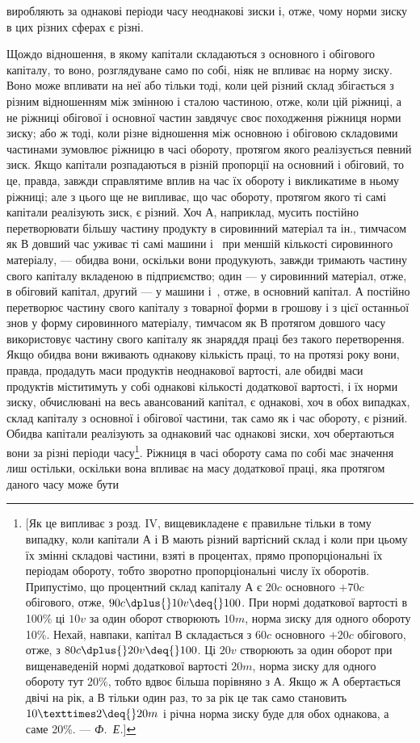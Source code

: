 \parcont{}  %
виробляють за однакові періоди часу неоднакові зиски і, отже,
чому норми зиску в цих різних сферах є різні.

Щождо відношення, в якому капітали складаються з основного і обігового капіталу, то воно,
розглядуване само по собі, ніяк не впливає на норму зиску. Воно може впливати на неї або тільки
тоді, коли цей різний склад збігається з різним відношенням між змінною і сталою частиною, отже,
коли цій ріжниці, а не ріжниці обігової і основної частин завдячує своє походження ріжниця норми
зиску; або ж тоді, коли різне відношення між основною і обіговою складовими частинами зумовлює
ріжницю в часі обороту, протягом якого реалізується певний зиск. Якщо капітали розпадаються в різній
пропорції на основний і обіговий, то це, правда, завжди справлятиме вплив
на час їх обороту і викликатиме в ньому ріжниці; але з цього
ще не випливає, що час обороту, протягом якого ті самі капітали реалізують зиск, є різний. Хоч $А$,
наприклад, мусить постійно перетворювати більшу частину продукту в сировинний матеріал та ін.,
тимчасом як $В$ довший час уживає ті самі
машини і~ при меншій кількості сировинного матеріалу, — обидва вони, оскільки вони продукують,
завжди тримають
частину свого капіталу вкладеною в підприємство; один — у сировинний матеріал, отже, в обіговий
капітал, другий — у машини
і~, отже, в основний капітал. $А$ постійно перетворює частину свого капіталу з товарної форми в
грошову і з цієї останньої знов у форму сировинного матеріалу, тимчасом як $В$ протягом довшого часу
використовує частину свого капіталу як
знаряддя праці без такого перетворення. Якщо обидва вони
вживають однакову кількість праці, то на протязі року вони,
правда, продадуть маси продуктів неоднакової вартості, але
обидві маси продуктів міститимуть у собі однакові кількості
додаткової вартості, і їх норми зиску, обчислювані на весь авансований капітал, є однакові, хоч в
обох випадках, склад капіталу з
основної і обігової частини, так само як і час обороту, є різний.
Обидва капітали реалізують за однаковий час однакові зиски, хоч
обертаються вони за різні періоди часу\footnote{
[Як це випливає з розд. IV, вищевикладене є правильне тільки в тому
випадку, коли капітали $А$ і $В$ мають різний вартісний склад і коли при цьому
їх змінні складові частини, взяті в процентах, прямо пропорціональні їх періодам обороту, тобто
зворотно пропорціональні числу їх оборотів. Припустімо,
що процентний склад капіталу $А$ є $20 c$ основного $+70 c$ обігового, отже,
$90 c \dplus{} 10 v \deq{} 100$. При нормі додаткової вартості в 100\% ці $10 v$ за один оборот створюють $10 m$, норма
зиску для одного обороту \deq{} 10\%. Нехай, навпаки, капітал $В$ складається з $60 c$ основного $+20 c$
обігового, отже, з $80 c \dplus{} 20 v \deq{} 100$.
Ці $20 v$ створюють за один оборот при вищенаведеній нормі додаткової вартості $20 m$, норма зиску для
одного обороту тут \deq{} 20\%, тобто вдвоє більша
порівняно з $А$. Якщо ж $А$ обертається двічі на рік, а $В$ тільки один раз, то за
рік це так само становить $10 × 2 \deq{} 20 m$ і річна норма зиску буде для обох
однакова, а саме 20\%. — \emph{Ф.~Е.}]
}. Ріжниця в часі обороту
сама по собі має значення лиш остільки, оскільки вона впливає
на масу додаткової праці, яка протягом даного часу може бути
\parbreak{}  %
